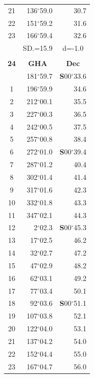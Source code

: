 \documentclass[10pt, a4paper]{report}
\begin{document}
\begin{scriptsize}
\begin{tabular*}{0.2\textwidth}[t]{@{\extracolsep{\fill}}|c|rr|}
21 & 136$^\circ$59.0 & \raisebox{0.24ex}{\boldmath$\cdot$~\boldmath$\cdot$~~}30.7\\
22 & 151$^\circ$59.2 & 31.6\\
23 & 166$^\circ$59.4 & 32.6\\
\hline
\rule{0pt}{2.4ex} & \multicolumn{1}{c}{SD.=15.9} & \multicolumn{1}{c|}{d=-1.0}\\
\hline
\multicolumn{1}{c}{}\\[-0.5ex]\hline
\multicolumn{1}{|c|}{\rule{0pt}{2.6ex}\textbf{24}} & \multicolumn{1}{c}{\textbf{GHA}} & \multicolumn{1}{c|}{\textbf{Dec}}\\
\hline\rule{0pt}{2.6ex}\noindent
0 & 181$^\circ$59.7 & \textbf{S}00$^\circ$33.6\\
1 & 196$^\circ$59.9 & 34.6\\
2 & 212$^\circ$00.1 & 35.5\\
3 & 227$^\circ$00.3 & \raisebox{0.24ex}{\boldmath$\cdot$~\boldmath$\cdot$~~}36.5\\
4 & 242$^\circ$00.5 & 37.5\\
5 & 257$^\circ$00.8 & 38.4\\[2Pt]
6 & 272$^\circ$01.0 & \textbf{S}00$^\circ$39.4\\
7 & 287$^\circ$01.2 & 40.4\\
8 & 302$^\circ$01.4 & 41.4\\
9 & 317$^\circ$01.6 & \raisebox{0.24ex}{\boldmath$\cdot$~\boldmath$\cdot$~~}42.3\\
10 & 332$^\circ$01.8 & 43.3\\
11 & 347$^\circ$02.1 & 44.3\\[2Pt]
12 & 2$^\circ$02.3 & \textbf{S}00$^\circ$45.3\\
13 & 17$^\circ$02.5 & 46.2\\
14 & 32$^\circ$02.7 & 47.2\\
15 & 47$^\circ$02.9 & \raisebox{0.24ex}{\boldmath$\cdot$~\boldmath$\cdot$~~}48.2\\
16 & 62$^\circ$03.1 & 49.2\\
17 & 77$^\circ$03.4 & 50.1\\[2Pt]
18 & 92$^\circ$03.6 & \textbf{S}00$^\circ$51.1\\
19 & 107$^\circ$03.8 & 52.1\\
20 & 122$^\circ$04.0 & 53.1\\
21 & 137$^\circ$04.2 & \raisebox{0.24ex}{\boldmath$\cdot$~\boldmath$\cdot$~~}54.0\\
22 & 152$^\circ$04.4 & 55.0\\
23 & 167$^\circ$04.7 & 56.0\\

\end{tabular*}
\end{scriptsize}
\end{document}
